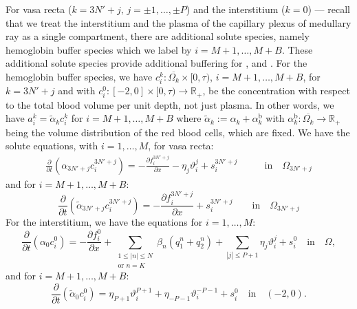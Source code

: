 \documentclass{article}
\begin{document}
For vasa recta ($k=3N'+j,\,j=\pm 1,\dots,\pm P$) and the interstitium ($k=0$) --- recall that we treat the interstitium and the plasma of the capillary plexus of medullary ray as a single compartment, there are additional solute species, namely hemoglobin buffer species which we label by $i=M+1,\dots,M+B$.
These additional solute species provide additional buffering for , and .
For the hemoglobin buffer species, we have $c_i^k:\overline{\Omega_k}\times [0,\tau)$, $i=M+1,\dots,M+B$, for $k=3N'+j$ and with $c_i^0:[-2,0]\times [0,\tau)\to \mathbb{R}_+$, be the concentration with respect to the total blood volume per unit depth, not just plasma.
In other words, we have $a_i^k = \tilde{\alpha}_kc_i^k$ for $i=M+1,\dots,M+B$ where $\tilde{\alpha}_k:=\alpha_k+\alpha_k^\mathrm{b}$ with $\alpha_k^\mathrm{b}:\overline{\Omega_k}\to \mathbb{R}_+$ being the volume distribution of the red blood cells, which are fixed.
We have the solute equations, with $i=1,\dots,M$, for vasa recta:
\begin{align}
    \frac{\partial }{\partial t}(\alpha_{3N'+j}c_i^{3N'+j}) = - \frac{\partial f_i^{3N'+j}}{\partial x} -\eta_{j}\vartheta_i^j+s_i^{3N'+j}\qquad &\text{in}\quad \Omega_{3N'+j}
\end{align}
    and for $i=M+1,\dots,M+B$:
\begin{equation}\label{eq:vr_sol}
    \frac{\partial }{\partial t}(\tilde{\alpha}_{3N'+j}c_i^{3N'+j}) = - \frac{\partial f_i^{3N'+j}}{\partial x} +s_i^{3N'+j}\qquad \text{in}\quad \Omega_{3N'+j}
\end{equation}
For the interstitium, we have the equations for $i=1,\dots,M$:
\begin{equation}\label{eq:int_sol}
    \frac{\partial}{\partial t}(\alpha_0 c_i^0) = - \frac{\partial f_i^0}{\partial x} + 
        \sum_{\substack{1\leq|n|\leq N\\\text{or } n=K}}\beta_n(q_{1}^n+q_{2}^n)+\sum_{|j|\leq P+1}\eta_j\vartheta_i^j+s_i^0\quad \text{in}\quad \Omega,
\end{equation}
    and for $i=M+1,\dots,M+B$:
\begin{equation}
    \frac{\partial}{\partial t}(\tilde{\alpha}_0 c_i^0) = 
    \eta_{P+1}\vartheta_i^{P+1}+\eta_{-P-1}\vartheta_i^{-P-1}+s_i^0\quad \text{in}\quad (-2,0).
\end{equation}
\end{document}
